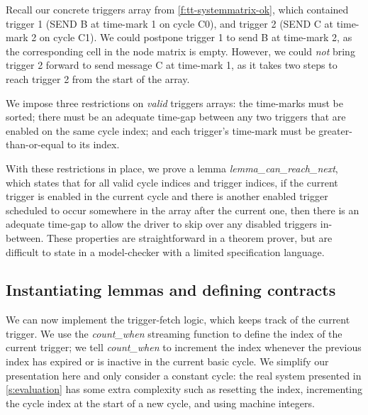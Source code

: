 Recall our concrete triggers array from \autoref{f:tt-systemmatrix-ok}, which contained trigger 1 (SEND B at time-mark 1 on cycle C0), and trigger 2 (SEND C at time-mark 2 on cycle C1).
We could postpone trigger 1 to send B at time-mark 2, as the corresponding cell in the node matrix is empty.
However, we could \emph{not} bring trigger 2 forward to send message C at time-mark 1, as it takes two steps to reach trigger 2 from the start of the array.

We impose three restrictions on \emph{valid} triggers arrays: the time-marks must be sorted; there must be an adequate time-gap between any two triggers that are enabled on the same cycle index; and each trigger's time-mark must be greater-than-or-equal to its index.

With these restrictions in place, we prove a lemma \emph{lemma_can_reach_next}, which states that for all valid cycle indices and trigger indices, if the current trigger is enabled in the current cycle and there is another enabled trigger scheduled to occur somewhere in the array after the current one, then there is an adequate time-gap to allow the driver to skip over any disabled triggers in-between.
These properties are straightforward in a theorem prover, but are difficult to state in a model-checker with a limited specification language.

\subsection{Instantiating lemmas and defining contracts}
\label{s:motivation:contract}

We can now implement the trigger-fetch logic, which keeps track of the current trigger.
We use the \emph{count_when} streaming function to define the index of the current trigger; we tell \emph{count_when} to increment the index whenever the previous index has expired or is inactive in the current basic cycle.
We simplify our presentation here and only consider a constant cycle: the real system presented in \autoref{s:evaluation} has some extra complexity such as resetting the index, incrementing the cycle index at the start of a new cycle, and using machine integers.

